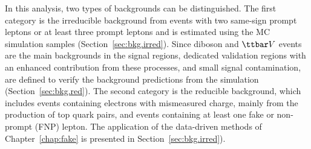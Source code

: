 In this analysis, two types of backgrounds can be distinguished.
 The first category is the irreducible background from events with two same-sign prompt 
leptons or at least three prompt leptons and is estimated using the MC simulation samples (Section~\ref{sec:bkg.irred}). 
Since diboson and $\ttbar V$ events are the main 
backgrounds in the signal regions, dedicated validation regions with an enhanced contribution from these processes, and small 
signal contamination, are defined to verify the background predictions from the simulation (Section~\ref{sec:bkg.red}). 
The second category is the reducible  
background, which includes events containing electrons with mismeasured charge, mainly from the production of top quark pairs, 
and events containing at least one fake or non-prompt (FNP) lepton.
The application of the data-driven methods of Chapter~\ref{chap:fake} 
is presented in Section~\ref{sec:bkg.irred}).

